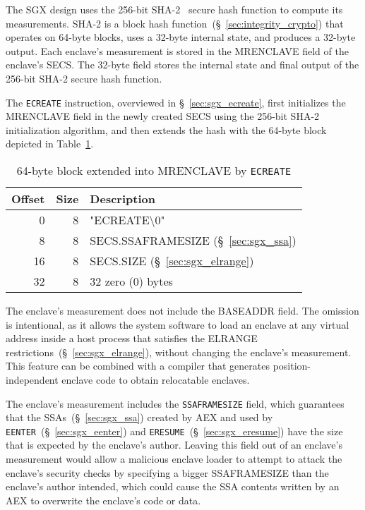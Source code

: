 
The SGX design uses the 256-bit SHA-2~\cite{fips2015shs} secure hash function
to compute its measurements. SHA-2 is a block hash
function~(\S~\ref{sec:integrity_crypto}) that operates on 64-byte blocks, uses
a 32-byte internal state, and produces a 32-byte output. Each enclave's
measurement is stored in the MRENCLAVE field of the enclave's SECS. The 32-byte
field stores the internal state and final output of the 256-bit SHA-2 secure
hash function.


\label{sec:sgx_ecreate_mrenclave}


The \texttt{ECREATE} instruction, overviewed in \S~\ref{sec:sgx_ecreate},
first initializes the MRENCLAVE field in the newly created SECS using the
256-bit SHA-2 initialization algorithm, and then extends the hash with
the 64-byte block depicted in Table~\ref{fig:ecreate_mrenclave}.

\begin{table}[hbt]
  \centering
  \begin{tabularx}{\columnwidth}{| r | r | X |}
  \hline
  \textbf{Offset} & \textbf{Size} & \textbf{Description}\\
  \hline
  0 & 8 & "ECREATE\textbackslash{}0" \\
  \hline
  8 & 8 & SECS.SSAFRAMESIZE (\S~\ref{sec:sgx_ssa}) \\
  \hline
  16 & 8 & SECS.SIZE (\S~\ref{sec:sgx_elrange}) \\
  \hline
  32 & 8 & 32 zero (0) bytes \\
  \hline
  \end{tabularx}
  \caption{
    64-byte block extended into MRENCLAVE by \texttt{ECREATE}
  }
  \label{fig:ecreate_mrenclave}
\end{table}

The enclave's measurement does not include the BASEADDR field. The omission is
intentional, as it allows the system software to load an enclave at any virtual
address inside a host process that satisfies the ELRANGE
restrictions~(\S~\ref{sec:sgx_elrange}), without changing the enclave's
measurement. This feature can be combined with a compiler that generates
position-independent enclave code to obtain relocatable enclaves.

The enclave's measurement includes the \texttt{SSAFRAMESIZE} field, which
guarantees that the SSAs~(\S~\ref{sec:sgx_ssa}) created by AEX and used by
\texttt{EENTER}~(\S~\ref{sec:sgx_eenter}) and
\texttt{ERESUME}~(\S~\ref{sec:sgx_eresume}) have the size that is expected by
the enclave's author. Leaving this field out of an enclave's measurement would
allow a malicious enclave loader to attempt to attack the enclave's security
checks by specifying a bigger SSAFRAMESIZE than the enclave's author intended,
which could cause the SSA contents written by an AEX to overwrite the enclave's
code or data.


